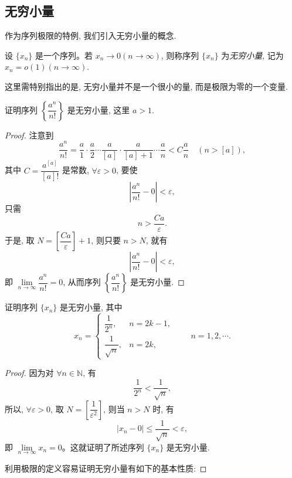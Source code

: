 \subsection{无穷小量}
\label{subsec:ma-2-1-3}

作为序列极限的特例, 我们引入无穷小量的概念.

\begin{definition}\label{definition:ma-2-1-2}
设 $\{x_n\}$ 是一个序列。若 $x_n\to0(n\to\infty)$, 则称序列 $\{x_n\}$ 为\emph{无穷小量}, 记为 $x_n=o(1)(n\to\infty)$.

这里需特别指出的是, 无穷小量并不是一个很小的量, 而是极限为零的一个变量.
\end{definition}


\begin{example}\label{example:ma-2-1-10}
证明序列 $\left\{\dfrac{a^n}{n!}\right\}$ 是无穷小量, 这里 $a>1$.
\end{example}


\begin{proof}
注意到
\[
  \frac{a^n}{n!}
  =
  \frac a1\cdot\frac a2\cdots\frac a{[a]}\cdot
  \frac a{[a]+1}\cdots\frac an
  < C\frac an
  \quad(n>[a]),
\]
其中 $C=\dfrac{a^{[a]}}{[a]!}$ 是常数, $\forall\varepsilon>0$, 要使
\[
  \left|\frac{a^n}{n!}-0\right|<\varepsilon,
\]
只需
\[
  n>\frac{Ca}{\varepsilon}.
\]
于是, 取 $N=\left[\dfrac{Ca}{\varepsilon}\right]+1$, 则只要 $n>N$, 就有
\[
  \left|\frac{a^n}{n!}-0\right|<\varepsilon,
\]
即 $\lim\limits_{n\to\infty}\dfrac{a^n}{n!}=0$, 从而序列 $\left\{\dfrac{a^n}{n!}\right\}$ 是无穷小量.
\end{proof}


\begin{example}\label{example:ma-2-1-11}
证明序列 $\{x_n\}$ 是无穷小量, 其中
\[
  x_n=
  \begin{cases}
    \dfrac1{2^n}, & n=2k-1,\\[0.4em]
    \dfrac1{\sqrt n}, & n=2k,
  \end{cases}
  \qquad n=1,2,\cdots .
\]
\end{example}


\begin{proof}
因为对 $\forall n\in\mathbb{N}$, 有
\[
  \frac1{2^n}<\frac1{\sqrt n},
\]
所以, $\forall\varepsilon>0$, 取 $N=\left[\dfrac1{\varepsilon^2}\right]$, 则当 $n>N$ 时, 有
\[
  |x_n-0|\leqslant\frac1{\sqrt n}<\varepsilon,
\]
即 $\lim\limits_{n\to\infty}x_n=0$。这就证明了所述序列 $\{x_n\}$ 是无穷小量.

利用极限的定义容易证明无穷小量有如下的基本性质:
\end{proof}



